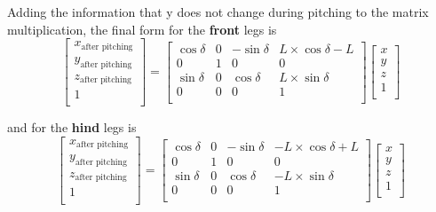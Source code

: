 Adding the information that y does not change during pitching to the matrix multiplication, the final form for the \textbf{front} legs is
\begin{equation}
   \begin{bmatrix}
   x_\text{after pitching} \\
   y_\text{after pitching} \\
   z_\text{after pitching} \\
   1                       \\
   \end{bmatrix}
   =
   \begin{bmatrix}
   \cos\delta & 0 & -\sin\delta & L \times \cos\delta - L \\
   0 & 1 & 0 & 0 \\
   \sin\delta & 0 & \cos\delta & L \times \sin\delta \\
   0 & 0 & 0 & 1 \\
   \end{bmatrix}
   \begin{bmatrix}
   x \\
   y \\
   z \\
   1 \\
   \end{bmatrix}
\end{equation}

and for the \textbf{hind} legs is
\begin{equation}
   \begin{bmatrix}
   x_\text{after pitching} \\
   y_\text{after pitching} \\
   z_\text{after pitching} \\
   1                       \\
   \end{bmatrix}
   =
   \begin{bmatrix}
   \cos\delta & 0 & -\sin\delta & -L \times \cos\delta + L \\
   0 & 1 & 0 & 0 \\
   \sin\delta & 0 & \cos\delta & -L \times \sin\delta \\
   0 & 0 & 0 & 1 \\
   \end{bmatrix}
   \begin{bmatrix}
   x \\
   y \\
   z \\
   1 \\
   \end{bmatrix}
\end{equation}

